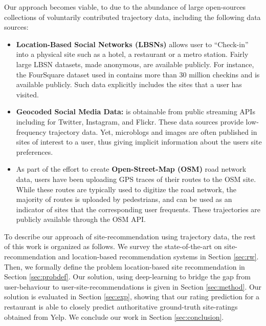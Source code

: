 Our approach becomes viable, to due to the abundance of large open-sources collections of voluntarily contributed trajectory data, including the following data sources:
 \begin{itemize}
\item {\bf Location-Based Social Networks (LBSNs)} allows user to ``Check-in'' into a physical site such as a hotel, a restaurant or a metro station. Fairly large LBSN datasets, made anonymous, are available publicly. For instance, the FourSquare dataset used in \cite{yang2015nationtelescope} contains more than 30 million checkins and is available publicly. Such data explicitly includes the sites that a user has visited. 
\item {\bf Geocoded Social Media Data: } is obtainable from public streaming APIs including for Twitter, Instagram, and Flickr. These data sources provide low-frequency trajectory data. Yet, microblogs and images are often published in sites of interest to a user, thus giving implicit information about the users site preferences.
\item  As part of the effort to create {\bf Open-Street-Map (OSM)} \cite{OSM,hw-osmugsm-08} road network data, users have been uploading GPS traces of their routes to the OSM site. While these routes are typically used to digitize the road network, the majority of routes is uploaded by pedestrians, and can be used as an indicator of sites that the corresponding user frequents. These trajectories are publicly available through the OSM API. 
\end{itemize}
To describe our approach of site-recommendation using trajectory data, the rest of this work is organized as follows. We survey the state-of-the-art on site-recommendation and location-based recommendation systems in Section \ref{sec:rw}. Then, we formally define the problem location-based site recommendation in Section \ref{sec:probdef}. Our solution, using deep-learning to bridge the gap from user-behaviour to user-site-recommendations is given in Section \ref{sec:method}. Our solution is evaluated in Section \ref{sec:exp}, showing that our rating prediction for a restaurant is able to closely predict authoritative ground-truth site-ratings obtained from Yelp. We conclude our work in Section \ref{sec:conclusion}.  